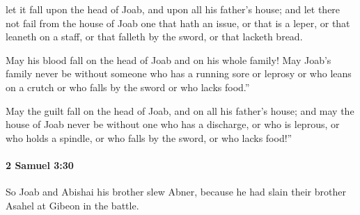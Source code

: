 			\begin{versebox}
					\item[BHS] 
					\item[ASV] let it fall upon the head of Joab, and upon all his father's house; and let there not fail from the house of Joab one that hath an issue, or that is a leper, or that leaneth on a staff, or that falleth by the sword, or that lacketh bread.
					\item[NIV] May his blood fall on the head of Joab and on his whole family! May Joab’s family never be without someone who has a running sore or leprosy or who leans on a crutch or who falls by the sword or who lacks food.”
					\item[NRSV] May the guilt fall on the head of Joab, and on all his father’s house; and may the house of Joab never be without one who has a discharge, or who is leprous, or who holds a spindle, or who falls by the sword, or who lacks food!”
			\end{versebox}

		\paragraph{2 Samuel 3:30} %
			\label{2SAMUEL-3-30}

			So Joab and Abishai his brother slew Abner, because he had slain their brother Asahel at Gibeon in the battle.

